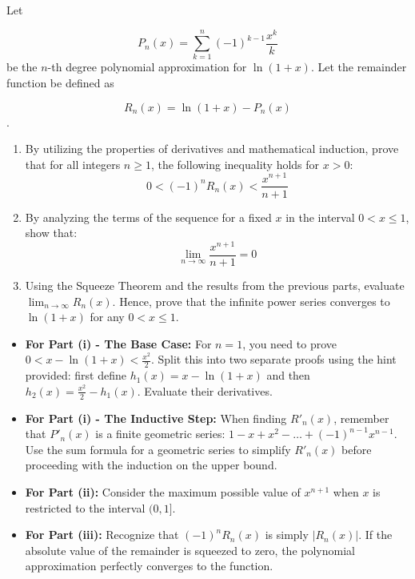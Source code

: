 \begin{problem}
Let 

$$P_n(x) = \sum_{k=1}^n (-1)^{k-1} \frac{x^k}{k}$$ be the $n$-th degree polynomial approximation for $\ln(1+x)$.
Let the remainder function be defined as 

$$R_n(x) = \ln(1+x) - P_n(x)$$.

\begin{enumerate}[label=(\roman*)]
\item By utilizing the properties of derivatives and mathematical induction, prove that for all integers $n \ge 1$, the following inequality holds for $x > 0$:
\[0 < (-1)^n R_n(x) < \frac{x^{n+1}}{n+1}\]

\item By analyzing the terms of the sequence for a fixed $x$ in the interval $0 < x \le 1$, show that:
\[\lim_{n \to \infty} \frac{x^{n+1}}{n+1} = 0\]

\item Using the Squeeze Theorem and the results from the previous parts, evaluate $\lim_{n \to \infty} R_n(x)$. Hence, prove that the infinite power series converges to $\ln(1+x)$ for any $0 < x \le 1$.
\end{enumerate}
\end{problem}

\begin{hint}
\begin{itemize}
\item \textbf{For Part (i) - The Base Case:} For $n = 1$, you need to prove $0 < x - \ln(1+x) < \frac{x^2}{2}$. Split this into two separate proofs using the hint provided: first define $h_1(x) = x - \ln(1+x)$ and then $h_2(x) = \frac{x^2}{2} - h_1(x)$. Evaluate their derivatives.
\item \textbf{For Part (i) - The Inductive Step:} When finding $R'_n(x)$, remember that $P'_n(x)$ is a finite geometric series: $1 - x + x^2 - \dots + (-1)^{n-1}x^{n-1}$. Use the sum formula for a geometric series to simplify $R'_n(x)$ before proceeding with the induction on the upper bound.
\item \textbf{For Part (ii):} Consider the maximum possible value of $x^{n+1}$ when $x$ is restricted to the interval $(0, 1]$.
\item \textbf{For Part (iii):} Recognize that $(-1)^n R_n(x)$ is simply $|R_n(x)|$. If the absolute value of the remainder is squeezed to zero, the polynomial approximation perfectly converges to the function.
\end{itemize}
\end{hint}

